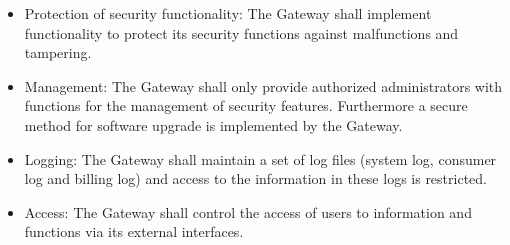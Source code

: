 \begin{itemize}
\item Protection of security functionality: The Gateway shall implement functionality to protect its security functions against malfunctions and tampering. 
\item Management: The Gateway shall only provide authorized administrators with functions for the management of security features.  Furthermore a secure method for software upgrade is implemented by the Gateway.
\item Logging: The Gateway shall maintain a set of log files (system log, consumer log and billing log) and access to the information in these logs is restricted.
\item Access: The Gateway shall control the access of users to information and functions via its external interfaces.
\end{itemize}